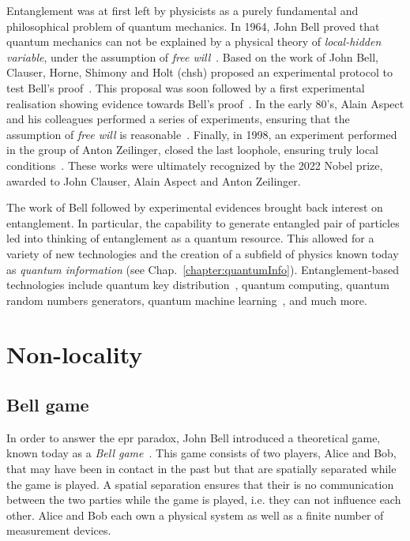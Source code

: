 \medbreak
Entanglement was at first left by physicists as a purely fundamental and philosophical problem of quantum mechanics.
In 1964, John Bell proved that quantum mechanics can not be explained by a physical theory of \textit{local-hidden variable}, under the assumption of \textit{free will}~\cite{Bell1964}. 
Based on the work of John Bell, Clauser, Horne, Shimony and Holt (\acrshort{chsh}) proposed an experimental protocol to test Bell's proof~\cite{Clauser1969}. 
This proposal was soon followed by a first experimental realisation showing evidence towards Bell's proof~\cite{Freedman1972}.
In the early 80's, Alain Aspect and his colleagues performed a series of experiments, ensuring that the assumption of \textit{free will} is reasonable~\cite{Aspect1982}.
Finally, in 1998, an experiment performed in the group of Anton Zeilinger, closed the last loophole, ensuring truly local conditions~\cite{Weihs1998}.
These works were ultimately recognized by the 2022 Nobel prize, awarded to John Clauser, Alain Aspect and Anton Zeilinger.

\medbreak
The work of Bell followed by experimental evidences brought back interest on entanglement.
In particular, the capability to generate entangled pair of particles led into thinking of entanglement as a quantum resource.
This allowed for a variety of new technologies and the creation of a subfield of physics known today as \textit{quantum information} (see Chap.~\ref{chapter:quantumInfo}).
Entanglement-based technologies include quantum key distribution~\cite{Ekert1991}, quantum computing, quantum random numbers generators, quantum machine learning~\cite{Biamonte2017}, and much more. 


\chapter{Non-locality}
\label{section:nonlocality}


\section{Bell game}

In order to answer the \acrshort{epr} paradox, John Bell introduced a theoretical game, known today as a \textit{Bell game}~\cite{Bell1964}.
This game consists of two players, Alice and Bob, that may have been in contact in the past but that are spatially separated while the game is played.
A spatial separation ensures that their is no communication between the two parties while the game is played, i.e. they can not influence each other.
Alice and Bob each own a physical system as well as a finite number of measurement devices.

